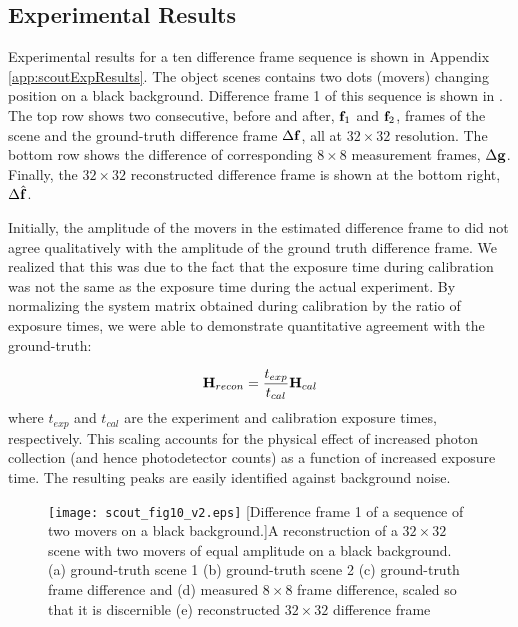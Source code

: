 \subsection{Experimental Results}
Experimental results for a ten difference frame sequence is shown in Appendix \ref{app:scoutExpResults}. The object scenes contains two dots (movers) changing position on a black background. Difference frame 1 of this sequence is shown in . The top row shows two consecutive, before and after, $\mathbf{f}_1$ and $\mathbf{f}_2$, frames of the scene and the ground-truth difference frame $\Delta \mathbf{f}$, all at $32 \times 32$ resolution. The bottom row shows the difference of corresponding $8 \times 8$ measurement frames, $\Delta \mathbf{g}$. Finally, the $32 \times 32$ reconstructed difference frame is shown at the bottom right, $\Delta \hat{ \mathbf{f} }$. 

Initially, the amplitude of the movers in the estimated difference frame to did not agree qualitatively with the amplitude of the ground truth difference frame. We realized that this was due to the fact that the exposure time during calibration was not the same as the exposure time during the actual experiment. By normalizing the system matrix obtained during calibration by the ratio of exposure times, we were able to demonstrate quantitative agreement with the ground-truth:

\begin{equation}
	\mathbf{H}_{recon} = \frac{t_{exp}}{t_{cal}} \mathbf{H}_{cal}
	\label{eq:ScoutCalibrationMatrixScaling}
\end{equation}
%
where $t_{exp}$ and $t_{cal}$ are the experiment and calibration exposure times, respectively. This scaling accounts for the physical effect of increased photon collection (and hence photodetector counts) as a function of increased exposure time. The resulting peaks are easily identified against background noise.

\begin{figure}
	\centering
	\texttt{[image: scout\_fig10\_v2.eps]}
	[Difference frame 1 of a sequence of two movers on a black background.]{A reconstruction of a $32 \times 32$ scene with two movers of equal amplitude on a black background. (a) ground-truth scene 1 (b) ground-truth scene 2 (c) ground-truth frame difference and (d) measured $8 \times 8$ frame difference, scaled so that it is discernible (e) reconstructed $32 \times 32$ difference frame}
	\label{fig:scout_fig10_un}
\end{figure}

